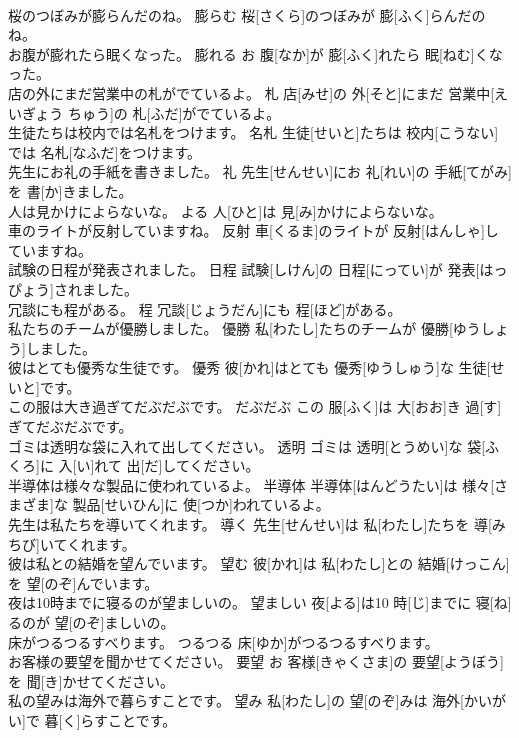 \documentclass[8pt]{extreport}
\begin{document}
\begin{CJK}{UTF8}{min}
\\	桜のつぼみが膨らんだのね。	膨らむ	桜[さくら]のつぼみが 膨[ふく]らんだのね。	
\\	お腹が膨れたら眠くなった。	膨れる	お 腹[なか]が 膨[ふく]れたら 眠[ねむ]くなった。	
\\	店の外にまだ営業中の札がでているよ。	札	店[みせ]の 外[そと]にまだ 営業中[えいぎょう ちゅう]の 札[ふだ]がでているよ。	
\\	生徒たちは校内では名札をつけます。	名札	生徒[せいと]たちは 校内[こうない]では 名札[なふだ]をつけます。	
\\	先生にお礼の手紙を書きました。	礼	先生[せんせい]にお 礼[れい]の 手紙[てがみ]を 書[か]きました。	
\\	人は見かけによらないな。	よる	人[ひと]は 見[み]かけによらないな。	
\\	車のライトが反射していますね。	反射	車[くるま]のライトが 反射[はんしゃ]していますね。	
\\	試験の日程が発表されました。	日程	試験[しけん]の 日程[にってい]が 発表[はっぴょう]されました。	
\\	冗談にも程がある。	程	冗談[じょうだん]にも 程[ほど]がある。	
\\	私たちのチームが優勝しました。	優勝	私[わたし]たちのチームが 優勝[ゆうしょう]しました。	
\\	彼はとても優秀な生徒です。	優秀	彼[かれ]はとても 優秀[ゆうしゅう]な 生徒[せいと]です。	
\\	この服は大き過ぎてだぶだぶです。	だぶだぶ	この 服[ふく]は 大[おお]き 過[す]ぎてだぶだぶです。	
\\	ゴミは透明な袋に入れて出してください。	透明	ゴミは 透明[とうめい]な 袋[ふくろ]に 入[い]れて 出[だ]してください。	
\\	半導体は様々な製品に使われているよ。	半導体	半導体[はんどうたい]は 様々[さまざま]な 製品[せいひん]に 使[つか]われているよ。	
\\	先生は私たちを導いてくれます。	導く	先生[せんせい]は 私[わたし]たちを 導[みちび]いてくれます。	
\\	彼は私との結婚を望んでいます。	望む	彼[かれ]は 私[わたし]との 結婚[けっこん]を 望[のぞ]んでいます。	
\\	夜は10時までに寝るのが望ましいの。	望ましい	夜[よる]は10 時[じ]までに 寝[ね]るのが 望[のぞ]ましいの。	
\\	床がつるつるすべります。	つるつる	床[ゆか]がつるつるすべります。	
\\	お客様の要望を聞かせてください。	要望	お 客様[きゃくさま]の 要望[ようぼう]を 聞[き]かせてください。	
\\	私の望みは海外で暮らすことです。	望み	私[わたし]の 望[のぞ]みは 海外[かいがい]で 暮[く]らすことです。	

\end{CJK}
\end{document}
